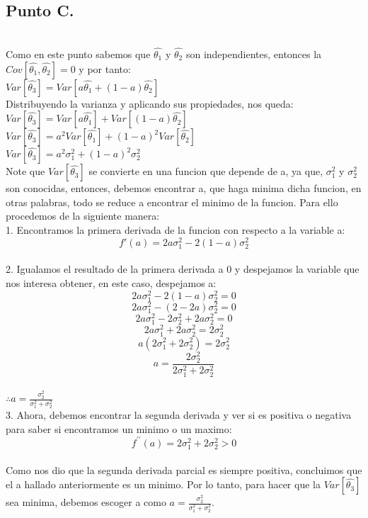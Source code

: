 \documentclass[letterpaper,12pt,onecolumn,titlepage]{article}
\begin{document}
\subsection{Punto C.} 
~\\ Como en este punto sabemos que $\hat{\theta_1}$ y $\hat{\theta_2}$ son independientes, entonces la $Cov[{\hat{\theta_1}},{\hat{\theta_2}}]=0$ y por tanto:
~\\ $Var[\hat{\theta_3}]=Var[a{\hat{\theta_1}}+(1-a){\hat{\theta_2}}]$
~\\ Distribuyendo la varianza y aplicando sus propiedades, nos queda:
~\\ $Var[\hat{\theta_3}]=Var[a{\hat{\theta_1}}]+Var[(1-a){\hat{\theta_2}}]$ 
~\\ $Var[\hat{\theta_3}]=a^2Var[{\hat{\theta_1}}]+(1-a)^2Var[{\hat{\theta_2}}]$
~\\ $Var[\hat{\theta_3}]=a^2\sigma_1^2+(1-a)^2\sigma_2^2$ 
~\\ Note que $Var[\hat{\theta_3}]$ se convierte en una funcion que depende de a, ya que, $\sigma_1^2$ y $\sigma_2^2$ son conocidas, entonces, debemos encontrar a, que haga minima dicha funcion, en otras palabras, todo se reduce a encontrar el minimo de la funcion. Para ello procedemos de la siguiente manera:
~\\ 1. Encontramos la primera derivada de la funcion con respecto a la variable a:
~\\ $$f'(a)=2a\sigma_1^2 - 2(1-a)\sigma_2^2$$
~\\ 2. Igualamos el resultado de la primera derivada a 0 y despejamos la variable que nos interesa obtener, en este caso, despejamos a:
$$2a\sigma_1^2 - 2(1-a)\sigma_2^2=0$$
$$2a\sigma_1^2 - (2-2a)\sigma_2^2=0$$
$$2a\sigma_1^2 - 2\sigma_2^2 + 2a\sigma_2^2=0$$
$$2a\sigma_1^2  + 2a\sigma_2^2= 2\sigma_2^2$$
$$a(2\sigma_1^2+2\sigma_2^2)=2\sigma_2^2$$
$$a=\frac{2\sigma_2^2}{2\sigma_1^2+2\sigma_2^2}$$
~\\$\therefore${$a=\frac{\sigma_2^2}{\sigma_1^2+\sigma_2^2}$}
~\\ 3. Ahora, debemos encontrar la segunda derivada y ver si es positiva o negativa para saber si encontramos un minimo o un maximo:
~\\$$f^{\prime\prime}(a)=2\sigma_1^2+2\sigma_2^2 > 0$$
~\\ Como nos dio que la segunda derivada parcial es siempre positiva, concluimos que el a hallado anteriormente es un minimo. Por lo tanto, para hacer que la $Var[\hat{\theta_3}]$ sea minima, debemos escoger a como $a=\frac{\sigma_2^2}{\sigma_1^2+\sigma_2^2}$.
\end{document}
